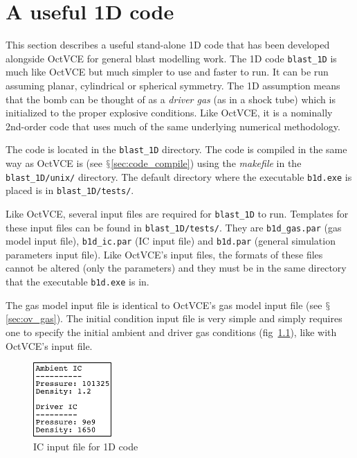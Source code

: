 \documentclass[pdftex, 12pt, a4paper]{report}
\begin{document}
\newpage

\appendix
\chapter{A useful 1D code}\label{sec:useful_tool}

This section describes a useful stand-alone 1D code that has been developed alongside OctVCE for general blast
modelling work.  The 1D code \verb'blast_1D' is much like OctVCE but much simpler to use and faster to run.  It can be run assuming 
planar, cylindrical or spherical symmetry.  The 1D assumption means that the bomb can be thought of as a \emph{driver gas} (as in a 
shock tube) which is 
initialized to the proper explosive conditions.  Like OctVCE, it is a nominally 2nd-order code that uses much of the same
underlying numerical methodology.   

The code is located in the \verb'blast_1D' directory.  The code is compiled in the same way as OctVCE 
is (see $\mathsection$\ref{sec:code_compile}) using the \emph{makefile} in the \verb'blast_1D/unix/' directory.
The default directory where the executable \verb'b1d.exe' is placed is in \verb'blast_1D/tests/'.

Like OctVCE, several input files are required for \verb'blast_1D' to run.  Templates for these input files can be found in
\verb'blast_1D/tests/'.  They are \verb'b1d_gas.par' (gas model input file), \verb'b1d_ic.par' (IC input file) and \verb'b1d.par'
(general simulation parameters input file).  Like OctVCE's input files, the formats of these files cannot be altered (only the
parameters) and they must be in the same directory that the executable \verb'b1d.exe' is in.

The gas model input file is identical to OctVCE's gas model input file (see $\mathsection$\ref{sec:ov_gas}).
The initial condition input file is very simple and simply requires one to specify the initial ambient and driver gas conditions 
(fig~\ref{fig:b1d_ic.par}), like with OctVCE's input file.

\begin{figure}[htp]
\centering
\includegraphics[width=3cm]{pics/b1d_ic_template.jpg}
\caption{IC input file for 1D code}
\label{fig:b1d_ic.par}
\end{figure}
\end{document}
